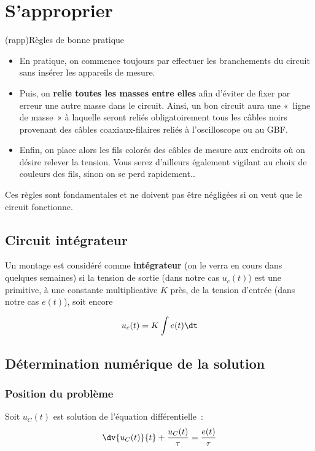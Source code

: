 \documentclass[../main/main.tex]{subfiles}
\begin{document}
{	\section{S'approprier}

	\begin{tcb}(rapp){Règles de bonne pratique}
		\begin{itemize}
			\item En pratique, on commence toujours par effectuer les branchements du
			      circuit sans insérer les appareils de mesure.
			\item Puis, on \textbf{relie toutes les masses entre elles} afin d'éviter
			      de fixer par erreur une autre masse dans le circuit. Ainsi, un bon
			      circuit aura une «~ligne de masse~» à laquelle seront reliés
			      obligatoirement tous les câbles noirs provenant des câbles
			      coaxiaux-filaires reliés à l'oscilloscope ou au GBF.
			\item Enfin, on place alors les fils colorés des câbles de mesure aux
			      endroits où on désire relever la tension. Vous serez d'ailleurs
			      également vigilant au choix de couleurs des fils, sinon on se perd
			      rapidement…
		\end{itemize}
		Ces règles sont fondamentales et ne doivent pas être négligées si
		on veut que le circuit fonctionne.
	\end{tcb}

	\subsection{Circuit intégrateur}

	Un montage est considéré comme \textbf{intégrateur} (on le verra en cours dans
	quelques semaines) si la tension de sortie (dans notre cas $u_{c}(t)$) est une
	primitive, à une constante multiplicative $K$ près, de la tension d'entrée (dans
	notre cas $e(t)$), soit encore

	\[u_{c}(t) = K \int e(t) \dt\]

	\subsection{Détermination numérique de la solution}
	\subsubsection{Position du problème}

	Soit $u_{C}(t)$ est solution de l'équation différentielle~:
	\[
		\dv{u_C(t)}{t} + \frac{u_C(t)}{\tau} = \frac{e(t)}{\tau}
	\]

}
\end{document}
